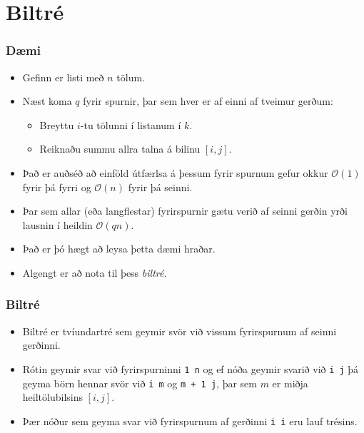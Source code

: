 \documentclass{beamer}
\begin{document}
\section[Biltré]{Biltré}

\begin{frame}
\frametitle{Dæmi}
\begin{itemize}
\item<1-> Gefinn er listi með $n$ tölum.
\item<2-> Næst koma $q$ fyrir spurnir, þar sem hver er af einni af tveimur gerðum:
	\begin{itemize}
	\item<3-> Breyttu $i$-tu tölunni í listanum í $k$.
	\item<4-> Reiknaðu summu allra talna á bilinu $[i, j]$.
	\end{itemize}
\item<5-> Það er auðséð að einföld útfærlsa á þessum fyrir spurnum gefur okkur $\mathcal{O}(1)$ fyrir þá fyrri og $\mathcal{O}(n)$ fyrir þá seinni.
\item<6-> Þar sem allar (eða langflestar) fyrirspurnir gætu verið af seinni gerðin yrði lausnin í heildin $\mathcal{O}(qn)$.
\item<7-> Það er þó hægt að leysa þetta dæmi hraðar.
\item<8-> Algengt er að nota til þess \emph{biltré}.
\end{itemize}
\end{frame}

\begin{frame}
\frametitle{Biltré}
\begin{itemize}
\item<1-> Biltré er tvíundartré sem geymir svör við vissum fyrirspurnum af seinni gerðinni.
\item<2-> Rótin geymir svar við fyrirspurninni \texttt{1 n} 
og ef nóða geymir svarið við \texttt{i j} þá geyma börn hennar svör við \texttt{i m} og \texttt{m + 1 j}, þar sem $m$ er miðja heiltölubilsins $[i, j]$.
\item<3-> Þær nóður sem geyma svar við fyrirspurnum af gerðinni \texttt{i i} eru lauf trésins.
\end{itemize}
\end{frame}
\end{document}
